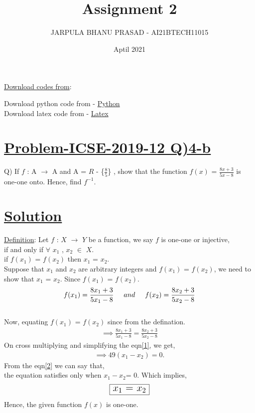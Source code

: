 \documentclass[journal,12pt,twocolumn]{IEEEtran}
\title{Assignment 2}
\author{JARPULA BHANU PRASAD - AI21BTECH11015}
\date{Aptil 2021}
\begin{document}
\maketitle
\noindent \Large\underline{Download codes from}:

\noindent \large Download python code from - \href{https://github.com/jarpula-Bhanu/Assignment-2/blob/main/codes/function.py}{Python}\\Download latex code from - \href{https://github.com/jarpula-Bhanu/Assignment-2/blob/main/Assignment2.tex}{Latex}

\section{\Large\underline{Problem-ICSE-2019-12 Q)4-b}}
\large\noindent Q) If $f$ : A $\rightarrow$ A and A = $R$ - \{$\frac{8}{5}$\} , show that the function $f(x)$ = $\frac{8x+3}{5x-8}$ is one-one onto. Hence, find $f^{-1}$. 
\section{\large\underline{Solution}}

\noindent \underline{Definition}: Let $f$ : $X$ $\rightarrow$ $Y$ be a function, we say $f$ is one-one or injective,\\if and only if $\forall$ $x_1$ , $x_2$ $\in$ $X$.\\ if $f(x_1)$ = $f(x_2)$ then $x_1$ = $x_2$.\\

\noindent Suppose that $x_1$ and $x_2$ are arbitrary integers and $f(x_1)$ = $f(x_2)$, we need to show that $x_1$ = $x_2$. Since $f(x_1)$ = $f(x_2)$.\\
\begin{align*}
f(x_1)=\frac{8x_1+3}{5x_1-8} \hspace{5mm} and \hspace{5mm} f(x_2)=\frac{8x_2+3}{5x_2-8}
\end{align*}\\
\noindent Now, equating $f(x_1)$ = $f(x_2)$ since from the defination.
\begin{align} \label{1}
\implies \frac{8x_1+3}{5x_1-8} = \frac{8x_2+3}{5x_2-8}
\end{align}
On cross multiplying and simplifying the eqn\eqref{1}, we get,
\begin{align} \label{2}
\implies 49(x_1 - x_2) = 0.
\end{align}
From the eqn\eqref{2} we can say that,\\ the equation satisfies only when $x_1 - x_2$= 0. Which implies,
\begin{align*}
\Large\framebox[1.2\width]{$x_1$ = $x_2$}
\end{align*}
Hence, the given function $f(x)$ is one-one.\\
\end{document}
